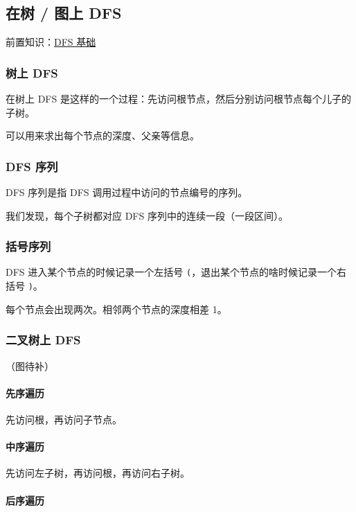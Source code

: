 
\subsection{在树 / 图上 DFS}

前置知识：\href{/search/dfs}{DFS 基础}

\subsubsection{树上 DFS}

在树上 DFS 是这样的一个过程：先访问根节点，然后分别访问根节点每个儿子的子树。

可以用来求出每个节点的深度、父亲等信息。

\subsubsection{DFS 序列}

DFS 序列是指 DFS 调用过程中访问的节点编号的序列。

我们发现，每个子树都对应 DFS 序列中的连续一段（一段区间）。

\subsubsection{括号序列}

DFS 进入某个节点的时候记录一个左括号 \texttt{(}，退出某个节点的啥时候记录一个右括号 \texttt{)}。

每个节点会出现两次。相邻两个节点的深度相差 1。

\subsubsection{二叉树上 DFS}

（图待补）

\paragraph{先序遍历}

先访问根，再访问子节点。

\paragraph{中序遍历}

先访问左子树，再访问根，再访问右子树。

\paragraph{后序遍历}

